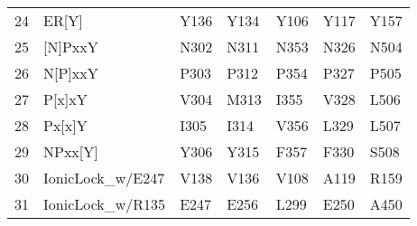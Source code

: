 \begin{table}[tbp]
\begin{tabular}{rllllll}
  24 & ER[Y] & Y136 & Y134 & Y106 & Y117 & Y157 \\ 
  25 & [N]PxxY & N302 & N311 & N353 & N326 & N504 \\ 
  26 & N[P]xxY & P303 & P312 & P354 & P327 & P505 \\ 
  27 & P[x]xY & V304 & M313 & I355 & V328 & L506 \\ 
  28 & Px[x]Y & I305 & I314 & V356 & L329 & L507 \\ 
  29 & NPxx[Y] & Y306 & Y315 & F357 & F330 & S508 \\ 
  30 & IonicLock\_w/E247 & V138 & V136 & V108 & A119 & R159 \\ 
  31 & IonicLock\_w/R135 & E247 & E256 & L299 & E250 & A450 \\ 
   \hline
\hline
\end{tabular}
\caption{} 
\label{tab:ChRhod_motifs}
\end{table}